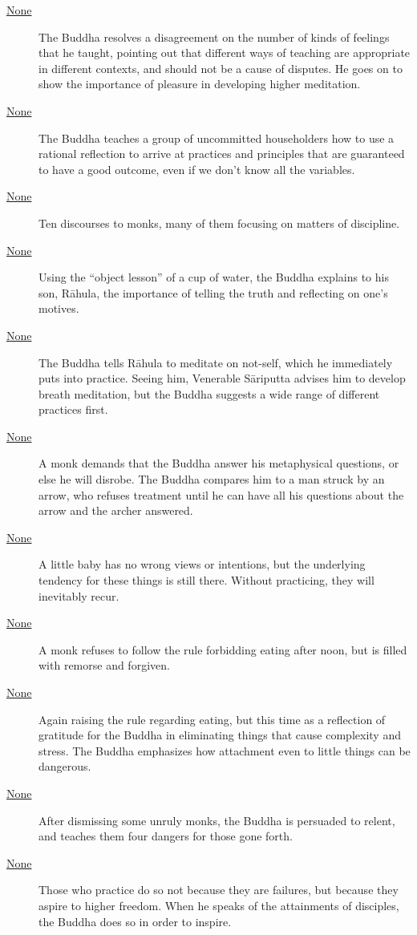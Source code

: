 \documentclass[12pt,openany]{book}%
\begin{document}
\begin{description}
\item[\href{\#mn59}{None}] The Buddha resolves a disagreement on the number of kinds of feelings that he taught, pointing out that different ways of teaching are appropriate in different contexts, and should not be a cause of disputes. He goes on to show the importance of pleasure in developing higher meditation.%
\item[\href{\#mn60}{None}] The Buddha teaches a group of uncommitted householders how to use a rational reflection to arrive at practices and principles that are guaranteed to have a good outcome, even if we don’t know all the variables.%
\item[\href{\#mn{-}bhikkhuvagga}{None}] Ten discourses to monks, many of them focusing on matters of discipline.%
\item[\href{\#mn61}{None}] Using the “object lesson” of a cup of water, the Buddha explains to his son, \textsanskrit{Rāhula}, the importance of telling the truth and reflecting on one’s motives.%
\item[\href{\#mn62}{None}] The Buddha tells \textsanskrit{Rāhula} to meditate on not-self, which he immediately puts into practice. Seeing him, Venerable \textsanskrit{Sāriputta} advises him to develop breath meditation, but the Buddha suggests a wide range of different practices first.%
\item[\href{\#mn63}{None}] A monk demands that the Buddha answer his metaphysical questions, or else he will disrobe. The Buddha compares him to a man struck by an arrow, who refuses treatment until he can have all his questions about the arrow and the archer answered.%
\item[\href{\#mn64}{None}] A little baby has no wrong views or intentions, but the underlying tendency for these things is still there. Without practicing, they will inevitably recur.%
\item[\href{\#mn65}{None}] A monk refuses to follow the rule forbidding eating after noon, but is filled with remorse and forgiven.%
\item[\href{\#mn66}{None}] Again raising the rule regarding eating, but this time as a reflection of gratitude for the Buddha in eliminating things that cause complexity and stress. The Buddha emphasizes how attachment even to little things can be dangerous.%
\item[\href{\#mn67}{None}] After dismissing some unruly monks, the Buddha is persuaded to relent, and teaches them four dangers for those gone forth.%
\item[\href{\#mn68}{None}] Those who practice do so not because they are failures, but because they aspire to higher freedom. When he speaks of the attainments of disciples, the Buddha does so in order to inspire.%

\end{description}
\end{document}
